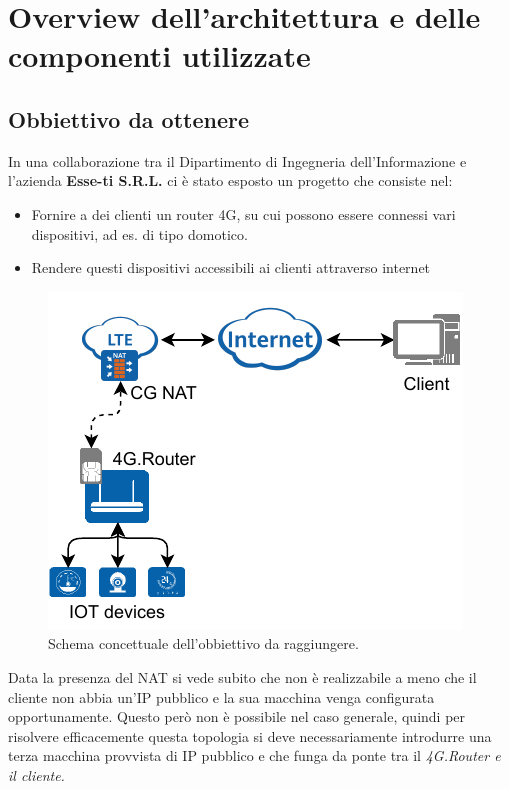 

\chapter{Overview dell'architettura e delle componenti utilizzate}

\label{ch:overview}

\section{Obbiettivo da ottenere}

In una collaborazione tra il Dipartimento di Ingegneria dell'Informazione e l'azienda \textbf{Esse-ti S.R.L.} ci è stato esposto un progetto che consiste nel:

\begin{itemize}
	\item Fornire a dei clienti un router 4G, su cui possono essere connessi vari dispositivi, ad es. di tipo domotico.
	\item Rendere questi dispositivi accessibili ai clienti attraverso internet
\end{itemize}

\begin{figure}[H]
	\centering
	\includegraphics[width=0.5\linewidth]{immagini/diag-goal}
	\caption{Schema concettuale dell'obbiettivo da raggiungere.}

	\label{fig:schema_concettuale}

\end{figure}

Data la presenza del NAT si vede subito che non è realizzabile a meno che il cliente non abbia un'IP pubblico e la sua macchina venga configurata opportunamente. Questo però non è possibile nel caso generale, quindi per risolvere efficacemente questa topologia si deve necessariamente introdurre una terza macchina provvista di IP pubblico e che funga da ponte tra il \it{4G.Router} e il cliente.


